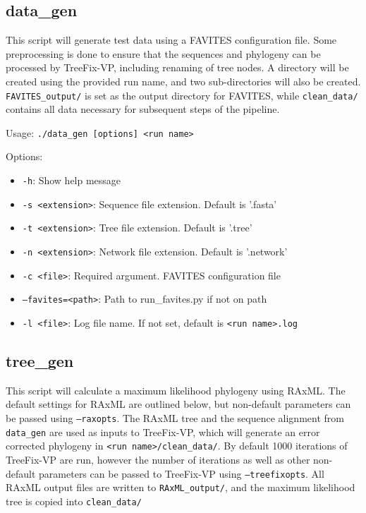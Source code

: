 \documentclass[11pt]{article}
\begin{document}
\subsection{data\_gen}
    This script will generate test data using a FAVITES configuration file. Some preprocessing is done to ensure that the sequences and phylogeny can be processed by TreeFix-VP, including renaming of tree nodes. A directory will be created using the provided run name, and two sub-directories will also be created. \texttt{FAVITES\_output/} is set as the output directory for FAVITES, while \texttt{clean\_data/} contains all data necessary for subsequent steps of the pipeline. 

    \vspace{2mm}
    
    Usage: \texttt{./data\_gen [options] <run name>}
    \vspace{2mm}

    Options:
    \begin{itemize}
        \setlength{\itemindent}{5mm}
        \item \texttt{-h}: Show help message
        \item \texttt{-s <extension>}: Sequence file extension. Default is '.fasta'
        \item \texttt{-t <extension>}: Tree file extension. Default is '.tree'
        \item \texttt{-n <extension>}: Network file extension. Default is '.network'
        \item \texttt{-c <file>}: Required argument. FAVITES configuration file
        \item \texttt{--favites=<path>}: Path to run\_favites.py if not on path
        \item \texttt{-l <file>}: Log file name. If not set, default is \texttt{<run name>.log}
    \end{itemize}

\subsection{tree\_gen}
    This script will calculate a maximum likelihood phylogeny using RAxML. The default settings for RAxML are outlined below, but non-default parameters can be passed using \texttt{--raxopts}. The RAxML tree and the sequence alignment from \texttt{data\_gen} are used as inputs to TreeFix-VP, which will generate an error corrected phylogeny in \texttt{<run name>/clean\_data/}. By default 1000 iterations of TreeFix-VP are run, however the number of iterations as well as other non-default parameters can be passed to TreeFix-VP using \texttt{--treefixopts}. All RAxML output files are written to \texttt{RAxML\_output/}, and the maximum likelihood tree is copied into \texttt{clean\_data/}
    \vspace{2mm}
\end{document}
